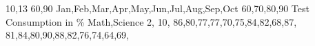 \documentclass[12pt a4paper]{article}
\begin{document}
{
}






\linegraph
    {10,13}
    {60,90}
    {Jan,Feb,Mar,Apr,May,Jun,Jul,Aug,Sep,Oct}
    {60,70,80,90}
    {}
    {Test Consumption in \%}
    {Math,Science}
    {
        {2},
        {10},
        {86,80,77,77,70,75,84,82,68,87},
        {81,84,80,90,88,82,76,74,64,69},
    }
    {}
\end{document}

